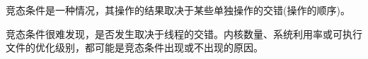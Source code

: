 竞态条件是一种情况，其操作的结果取决于某些单独操作的交错(操作的顺序)。

竞态条件很难发现，是否发生取决于线程的交错。内核数量、系统利用率或可执行文件的优化级别，都可能是竞态条件出现或不出现的原因。